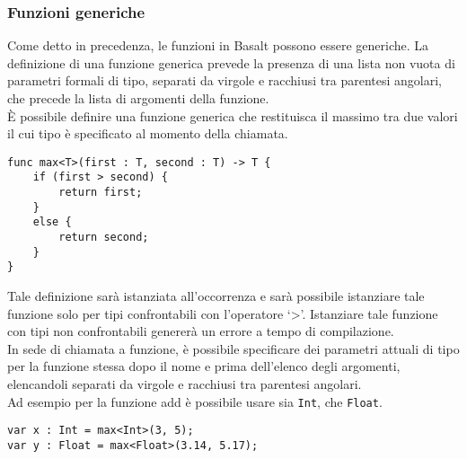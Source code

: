 \subsubsection{Funzioni generiche}
Come detto in precedenza, le funzioni in Basalt possono essere generiche. 
La definizione di una funzione generica prevede la presenza di una lista 
non vuota di parametri formali di tipo, separati da virgole e racchiusi tra 
parentesi angolari, che precede la lista di argomenti della funzione. \\

È possibile definire una funzione generica che restituisca il massimo tra due 
valori il cui tipo è specificato al momento della chiamata.

\vspace{0.5cm}
\begin{lstlisting}[frame=single]
func max<T>(first : T, second : T) -> T {
    if (first > second) {
        return first; 
    }
    else {
        return second;
    }
}
\end{lstlisting}
\vspace{0.5cm}


Tale definizione sarà istanziata all’occorrenza e sarà possibile 
istanziare tale funzione solo per tipi confrontabili con l’operatore ‘>’. 
Istanziare tale funzione con tipi non confrontabili genererà un errore a tempo 
di compilazione. \\

In sede di chiamata a funzione, è possibile specificare dei parametri attuali di 
tipo per la funzione stessa dopo il nome e prima dell’elenco degli argomenti, 
elencandoli separati da virgole e racchiusi tra parentesi angolari. \\

Ad esempio per la funzione add è possibile usare sia \texttt{Int}, che \texttt{Float}.

\vspace{0.5cm}
\begin{lstlisting}[frame=single]
var x : Int = max<Int>(3, 5);
var y : Float = max<Float>(3.14, 5.17);
\end{lstlisting}
\vspace{0.5cm}